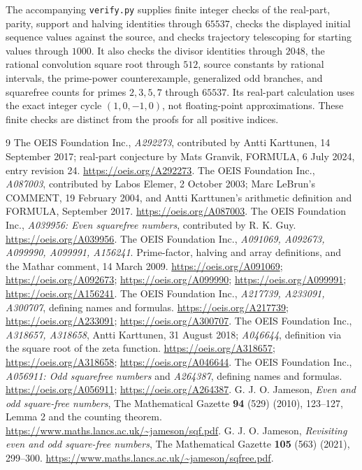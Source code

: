 \documentclass[11pt]{article}
\begin{document}
The accompanying \texttt{verify.py} supplies finite integer checks of
the real-part, parity, support and halving identities through $65537$,
checks the displayed initial sequence values against the source, and
checks trajectory telescoping for starting values through $1000$.
It also checks the divisor identities through $2048$, the rational
convolution square root through $512$, source constants by rational
intervals, the prime-power counterexample, generalized odd branches,
and squarefree counts for primes $2,3,5,7$ through $65537$.
Its real-part calculation uses the exact integer cycle $(1,0,-1,0)$,
not floating-point approximations. These finite checks are distinct from
the proofs for all positive indices.

\small
\begin{thebibliography}{9}
 The OEIS Foundation Inc.,
\emph{A292273}, contributed by Antti Karttunen, 14 September 2017;
real-part conjecture by Mats Granvik, FORMULA, 6 July 2024,
entry revision 24. \url{https://oeis.org/A292273}.
 The OEIS Foundation Inc.,
\emph{A087003}, contributed by Labos Elemer, 2 October 2003;
Marc LeBrun's COMMENT, 19 February 2004, and Antti Karttunen's
arithmetic definition and FORMULA, September 2017.
\url{https://oeis.org/A087003}.
 The OEIS Foundation Inc.,
\emph{A039956: Even squarefree numbers}, contributed by R. K. Guy.
\url{https://oeis.org/A039956}.
 The OEIS Foundation Inc.,
\emph{A091069, A092673, A099990, A099991, A156241}.
Prime-factor, halving and array definitions, and the Mathar comment,
14 March 2009. \url{https://oeis.org/A091069};
\url{https://oeis.org/A092673}; \url{https://oeis.org/A099990};
\url{https://oeis.org/A099991}; \url{https://oeis.org/A156241}.
 The OEIS Foundation Inc.,
\emph{A217739, A233091, A300707}, defining names and formulas.
\url{https://oeis.org/A217739}; \url{https://oeis.org/A233091};
\url{https://oeis.org/A300707}.
 The OEIS Foundation Inc.,
\emph{A318657, A318658}, Antti Karttunen, 31 August 2018;
\emph{A046644}, definition via the square root of the zeta function.
\url{https://oeis.org/A318657}; \url{https://oeis.org/A318658};
\url{https://oeis.org/A046644}.
 The OEIS Foundation Inc.,
\emph{A056911: Odd squarefree numbers} and
\emph{A264387}, defining names and formulas.
\url{https://oeis.org/A056911}; \url{https://oeis.org/A264387}.
 G. J. O. Jameson,
\emph{Even and odd square-free numbers},
The Mathematical Gazette \textbf{94} (529) (2010), 123--127,
Lemma 2 and the counting theorem.
\url{https://www.maths.lancs.ac.uk/~jameson/sqf.pdf}.
 G. J. O. Jameson,
\emph{Revisiting even and odd square-free numbers},
The Mathematical Gazette \textbf{105} (563) (2021), 299--300.
\url{https://www.maths.lancs.ac.uk/~jameson/sqfree.pdf}.
\end{thebibliography}
\end{document}
